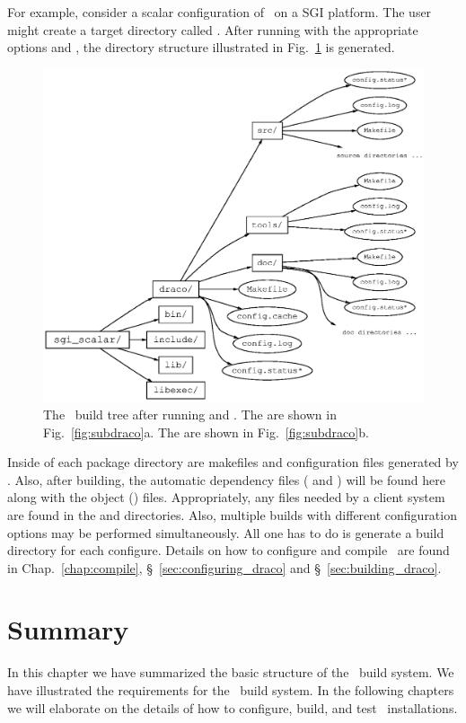 For example, consider a scalar configuration of \draco\ on a SGI
platform.  The user might create a target directory called
.  After running  with the
appropriate options and \gmake, the directory structure illustrated in
Fig.~\ref{fig:build_tree} is generated.
\begin{figure}
  \centerline{\includegraphics[width=6in]{fig/build_tree.eps}}
  \caption{The \draco\ build tree after running  and
    .  The  are shown in
    Fig.~\ref{fig:subdraco}a. The  are shown in
    Fig.~\ref{fig:subdraco}b.}  
  \label{fig:build_tree}
\end{figure}
Inside of each package directory are makefiles and configuration files
generated by .  Also, after building, the automatic
dependency files ( and ) will be found here
along with the object () files.  Appropriately, any files
needed by a client system are found in the  and
 directories.  Also, multiple builds with different
configuration options may be performed simultaneously.  All one has to
do is generate a build directory for each configure.  Details on how
to configure and compile \draco\ are found in
Chap.~\ref{chap:compile}, \S~\ref{sec:configuring_draco} and
\S~\ref{sec:building_draco}.


\section{Summary}

In this chapter we have summarized the basic structure of the \draco\ 
build system.  We have illustrated the requirements for the \draco\ 
build system.  In the following chapters we will elaborate on the
details of how to configure, build, and test \draco\ installations.

